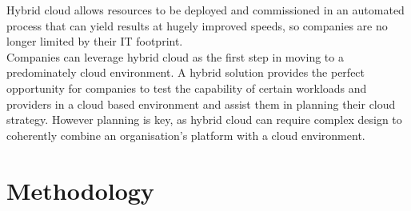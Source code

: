 \documentclass[a4paper,12pt]{report}
\begin{document}
Hybrid cloud allows resources to be deployed and commissioned in an automated process that can yield results at hugely improved speeds, so companies are no longer limited by their IT footprint.\\

Companies can leverage hybrid cloud as the first step in moving to a predominately cloud environment. A hybrid solution provides the perfect opportunity for companies to test the capability of certain workloads and providers in a cloud based environment and assist them in planning their cloud strategy. However planning is key, as hybrid cloud can require complex design to coherently combine an organisation’s platform with a cloud environment.

\chapter{Methodology}
\end{document}

